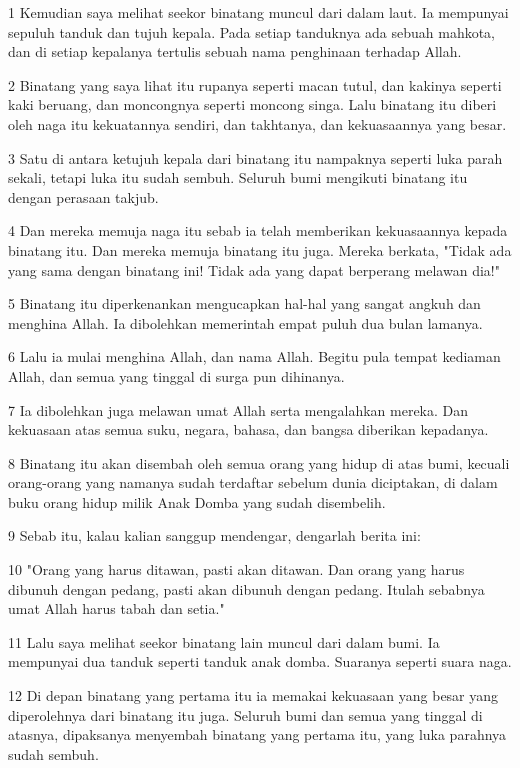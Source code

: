 \par 1 Kemudian saya melihat seekor binatang muncul dari dalam laut. Ia mempunyai sepuluh tanduk dan tujuh kepala. Pada setiap tanduknya ada sebuah mahkota, dan di setiap kepalanya tertulis sebuah nama penghinaan terhadap Allah.
\par 2 Binatang yang saya lihat itu rupanya seperti macan tutul, dan kakinya seperti kaki beruang, dan moncongnya seperti moncong singa. Lalu binatang itu diberi oleh naga itu kekuatannya sendiri, dan takhtanya, dan kekuasaannya yang besar.
\par 3 Satu di antara ketujuh kepala dari binatang itu nampaknya seperti luka parah sekali, tetapi luka itu sudah sembuh. Seluruh bumi mengikuti binatang itu dengan perasaan takjub.
\par 4 Dan mereka memuja naga itu sebab ia telah memberikan kekuasaannya kepada binatang itu. Dan mereka memuja binatang itu juga. Mereka berkata, "Tidak ada yang sama dengan binatang ini! Tidak ada yang dapat berperang melawan dia!"
\par 5 Binatang itu diperkenankan mengucapkan hal-hal yang sangat angkuh dan menghina Allah. Ia dibolehkan memerintah empat puluh dua bulan lamanya.
\par 6 Lalu ia mulai menghina Allah, dan nama Allah. Begitu pula tempat kediaman Allah, dan semua yang tinggal di surga pun dihinanya.
\par 7 Ia dibolehkan juga melawan umat Allah serta mengalahkan mereka. Dan kekuasaan atas semua suku, negara, bahasa, dan bangsa diberikan kepadanya.
\par 8 Binatang itu akan disembah oleh semua orang yang hidup di atas bumi, kecuali orang-orang yang namanya sudah terdaftar sebelum dunia diciptakan, di dalam buku orang hidup milik Anak Domba yang sudah disembelih.
\par 9 Sebab itu, kalau kalian sanggup mendengar, dengarlah berita ini:
\par 10 "Orang yang harus ditawan, pasti akan ditawan. Dan orang yang harus dibunuh dengan pedang, pasti akan dibunuh dengan pedang. Itulah sebabnya umat Allah harus tabah dan setia."
\par 11 Lalu saya melihat seekor binatang lain muncul dari dalam bumi. Ia mempunyai dua tanduk seperti tanduk anak domba. Suaranya seperti suara naga.
\par 12 Di depan binatang yang pertama itu ia memakai kekuasaan yang besar yang diperolehnya dari binatang itu juga. Seluruh bumi dan semua yang tinggal di atasnya, dipaksanya menyembah binatang yang pertama itu, yang luka parahnya sudah sembuh.
